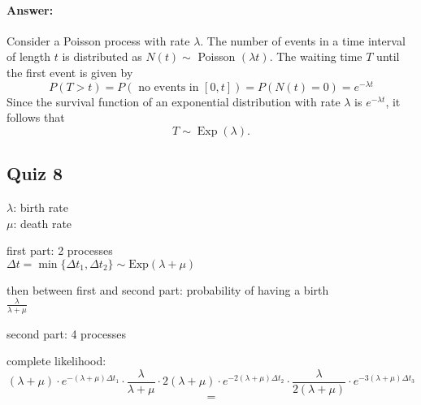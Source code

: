\documentclass[11pt, headings=standardclasses, parskip=half, twoside]{scrartcl}
\begin{document}
\paragraph{Answer:}
Consider a Poisson process with rate $\lambda$. The number of events in a time interval of length $t$ is distributed as $N(t) \sim$ Poisson $(\lambda t)$. The waiting time $T$ until the first event is given by
$$
P(T>t)=P(\text { no events in }[0, t])=P(N(t)=0)=e^{-\lambda t}
$$
Since the survival function of an exponential distribution with rate $\lambda$ is $e^{-\lambda t}$, it follows that
$$
T \sim \operatorname{Exp}(\lambda) .
$$



\subsection{Quiz 8}


\(\lambda\): birth rate\\
\(\mu\): death rate
 

first part: 2 processes\\
\(
\Delta t = \min\{\Delta t_1, \Delta t_2\} \sim \mathrm{Exp}(\lambda + \mu)
\)

then between first and second part: probability of having a birth\\
\(\frac{\lambda}{\lambda + \mu}\)


second part: 4 processes




complete likelihood:
\[
(\lambda + \mu) \cdot e^{-(\lambda + \mu) \Delta t_1} \cdot \frac{\lambda}{\lambda + \mu} \cdot 2 (\lambda + \mu) \cdot e^{-2(\lambda + \mu) \Delta t_2} \cdot \frac{\lambda}{2 (\lambda + \mu)} \cdot e^{-3(\lambda + \mu) \Delta t_3}
\]
\[
= 
\]
\end{document}
